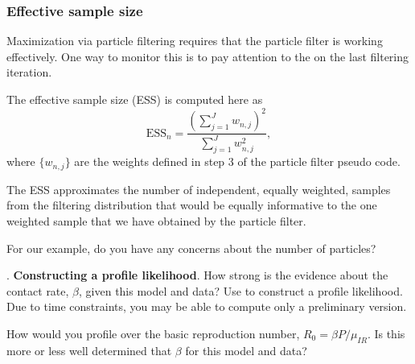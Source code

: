 \documentclass{beamer}\usepackage[]{graphicx}\usepackage[]{color}
\newcommand\answer[2]{#1} %
\begin{document}
\begin{frame}

\frametitle{Effective sample size}

\bi
\item Maximization via particle filtering requires that the particle filter is working effectively. 
One way to monitor this is to pay attention to the  on the last filtering iteration. 

\item The effective sample size (ESS) is computed here as
$$ \mathrm{ESS}_{n}= \frac{\left(\sum_{j=1}^J w_{n,j}\right)^2}{\sum_{j=1}^J w_{n,j}^2},$$
where $\{w_{n,j}\}$ are the weights defined in step 3 of the particle filter pseudo code.

\item
The ESS approximates the number of independent, equally weighted, samples from the filtering distribution that would be equally informative to the one weighted sample that we have obtained by the particle filter. 

\item For our example, do you have any concerns about the number of particles?

\ei

\end{frame} 

\begin{frame}[fragile]

\myquestion. {\bf Constructing a profile likelihood}. How strong is the evidence about the contact rate, $\beta$, given this model and data? Use  to construct a profile likelihood. Due to time constraints, you may be able to compute only a preliminary version.

\answer{\vspace{30mm}}{todo}

\bi
\item How would you profile over the basic reproduction number, $R_0=\beta P/\mu_{IR}$. 
Is this more or less well determined that $\beta$ for this model and data?
\ei

\end{frame}  
\end{document}
